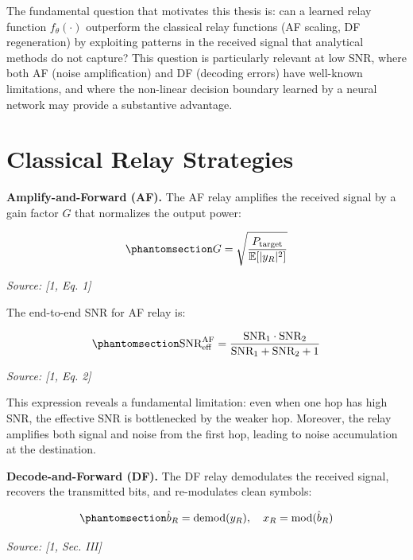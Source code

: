 The fundamental question that motivates this thesis is: can a learned relay function \(f_\theta(\cdot)\) outperform the classical relay functions (AF scaling, DF regeneration) by exploiting patterns in the received signal that analytical methods do not capture? This question is particularly relevant at low SNR, where both AF (noise amplification) and DF (decoding errors) have well-known limitations, and where the non-linear decision boundary learned by a neural network may provide a substantive advantage.

\section{Classical Relay Strategies}\label{sec:classical-relay-strategies}

\textbf{Amplify-and-Forward (AF).} The AF relay amplifies the received signal by a gain factor \(G\) that normalizes the output power:

\begin{equation}\protect\phantomsection\label{eq:af-gain}{G = \sqrt{\frac{P_{\text{target}}}{\mathbb{E}[|y_R|^2]}}
}\end{equation} \par{\small\textit{Source: [1, Eq. 1]}}

The end-to-end SNR for AF relay is:

\begin{equation}\protect\phantomsection\label{eq:af-snr}{\text{SNR}_{\text{eff}}^{\text{AF}} = \frac{\text{SNR}_1 \cdot \text{SNR}_2}{\text{SNR}_1 + \text{SNR}_2 + 1}
}\end{equation} \par{\small\textit{Source: [1, Eq. 2]}}

This expression reveals a fundamental limitation: even when one hop has high SNR, the effective SNR is bottlenecked by the weaker hop. Moreover, the relay amplifies both signal and noise from the first hop, leading to noise accumulation at the destination.

\textbf{Decode-and-Forward (DF).} The DF relay demodulates the received signal, recovers the transmitted bits, and re-modulates clean symbols:

\begin{equation}\protect\phantomsection\label{eq:df-demod-remod}{\hat{b}_R = \text{demod}(y_R), \quad x_R = \text{mod}(\hat{b}_R)
}\end{equation} \par{\small\textit{Source: [1, Sec. III]}}

